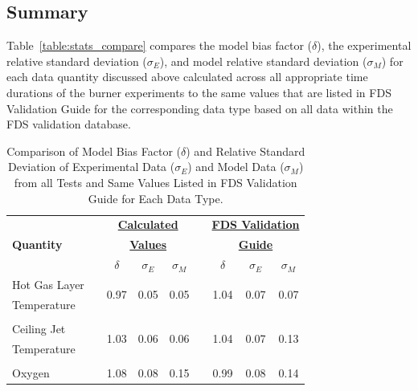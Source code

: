 \subsection{Summary}
Table~\ref{table:stats_compare} compares the model bias factor ($\delta$), the experimental relative standard deviation ($\sigma_E$), and model relative standard deviation ($\sigma_M$) for each data quantity discussed above calculated across all appropriate time durations of the burner experiments to the same values that are listed in FDS Validation Guide for the corresponding data type based on all data within the FDS validation database. 
\begin{table}[!ht]
\caption[Calculated $\delta$, $\sigma_E$, and $\sigma_M$ Values Compared to Values Stated in FDS Validation Guide.]{Comparison of Model Bias Factor ($\delta$) and Relative Standard Deviation of Experimental Data ($\sigma_E$) and Model Data ($\sigma_M$) from all Tests and Same Values Listed in FDS Validation Guide for Each Data Type.}
\begin{center}
\begin{tabular}{lcccccccc}
\toprule
					& & \multicolumn{3}{c}{\textbf{\underline{Calculated}}} & & \multicolumn{3}{c}{\textbf{\underline{FDS Validation}}}   \\
\textbf{Quantity} 	& & \multicolumn{3}{c}{\textbf{\underline{Values}}} 	& & \multicolumn{3}{c}{\textbf{\underline{Guide}}} \\
				 	& & $\delta$ 	&  $\sigma_E$ 	& 	$\sigma_M$ 			& & $\delta$ 	&  $\sigma_E$ 	& 	$\sigma_M$ 		\\	
\midrule
Hot Gas Layer 		& & \multirow{2}{*}{0.97} & \multirow{2}{*}{0.05} & \multirow{2}{*}{0.05} & & \multirow{2}{*}{1.04} & \multirow{2}{*}{0.07} & \multirow{2}{*}{0.07} 	\\
Temperature 		& &					   	  & 					  & 					  & &						& 					   &						\\
\multicolumn{9}{c}{} \\
Ceiling Jet 		& & \multirow{2}{*}{1.03} & \multirow{2}{*}{0.06} & \multirow{2}{*}{0.06} & & \multirow{2}{*}{1.04} & \multirow{2}{*}{0.07} & \multirow{2}{*}{0.13} 	\\
Temperature 		& & 					  & 					  & 					  & &						& 					   &						\\
\multicolumn{9}{c}{} \\
Oxygen 				& & \multirow{2}{*}{1.08}  & \multirow{2}{*}{0.08} & \multirow{2}{*}{0.15} & & \multirow{2}{*}{0.99} & \multirow{2}{*}{0.08} & \multirow{2}{*}{0.14} 	\\

\end{tabular}
\end{center}
\end{table}
